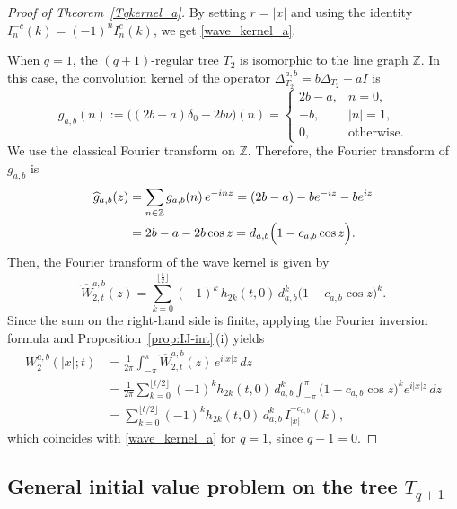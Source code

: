 \documentclass[12pt]{amsart}
\numberwithin{equation}{section}
\theoremstyle{boldremark}
\begin{document}
\begin{proof}[Proof of Theorem~\ref{Tqkernel_a}]
By setting $r=|x|$ and using the identity $I_n^{-c}(k)=(-1)^nI_n^c(k)$, we get \eqref{wave_kernel_a}.

When $q=1$, the $(q+1)$-regular tree $T_2$ is isomorphic to the line graph $\mathbb Z$. In this case, the convolution kernel of the operator $\Delta^{a,b}_{T_{2}}=b\Delta_{T_{2}}-aI$ is 
\[ g_{a,b}(n):=\big((2b-a)\delta_0 - 2b\nu\big)(n) =\begin{cases} 2b-a, & n=0,\\ -b, & |n|=1,\\ 0, & \text{otherwise}. \end{cases} 
\] 
We use the classical Fourier transform on $\mathbb Z$. Therefore, the Fourier transform of $g_{a,b}$ is 
\begin{equation*}
\begin{split} 
\widehat{g}_{a,b}(z) &= \sum_{n \in \mathbb{Z}} g_{a,b}(n)\, e^{-inz} =(2b-a)-be^{-iz}-be^{iz}\\ &=2b-a-2b\cos z =d_{a,b}\Bigl(1-c_{a,b}\cos z\Bigr). 
\end{split} 
\end{equation*} 
Then, the Fourier transform of the wave kernel is given by 
\begin{equation*}
\widehat{W}^{a,b}_{2,t}(z) = \sum_{k=0}^{\lfloor \frac{t}{2} \rfloor}(-1)^k \, h_{2k}(t,0)\, d_{a,b}^k\bigl(1- c_{a,b}\cos z\bigr)^{k}. \end{equation*} 
Since the sum on the right-hand side is finite, applying the Fourier inversion formula and Proposition~\ref{prop:IJ-int}\,(i) yields
\begin{equation}\label{eq. W2 evaluation}
\begin{split} 
W^{a,b}_{2}(|x|;t) &=\frac{1}{2\pi} \int_{-\pi}^{\pi} \widehat{W}^{a,b}_{2,t}(z)\, e^{i|x|z}\,dz\\ &=\frac{1}{2\pi}\sum_{k=0}^{\lfloor t/2 \rfloor} (-1)^k h_{2k}(t,0)\,d_{a,b}^k \int_{-\pi}^{\pi}\!\bigl(1- c_{a,b}\cos z\bigr)^{k}e^{i|x|z}\,dz\\ &=\sum_{k=0}^{\lfloor t/2 \rfloor} (-1)^k h_{2k}(t,0)\,d_{a,b}^k\, I_{|x|}^{-c_{a,b}}(k),
\end{split} 
\end{equation}
which coincides with \eqref{wave_kernel_a} for $q=1$, since $q-1=0$.
\end{proof}

\subsection{General initial value problem on the tree ${T}_{q+1}$}
\end{document}
